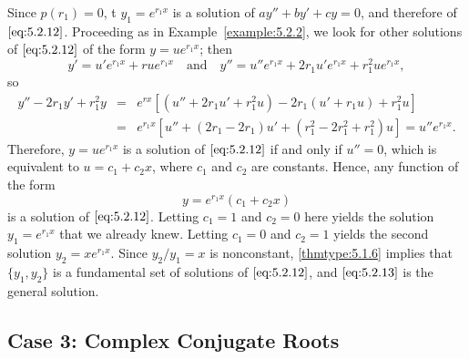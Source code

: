 \documentclass{ximera}
\begin{document}
Since $p(r_1)=0$, t $y_1=e^{r_1x}$ is a solution of
$ay''+by'+cy=0$, and therefore of $\eqref{eq:5.2.12}$. Proceeding as in
Example~\ref{example:5.2.2}, we look for other solutions of $\eqref{eq:5.2.12}$
of the form $y=ue^{r_1x}$; then
$$
y'=u'e^{r_1x}+rue^{r_1x}\quad\mbox{and}\quad
y''=u''e^{r_1x}+2r_1u'e^{r_1x}+r_1^2ue^{r_1x},
$$
so
\begin{eqnarray*}
y''-2r_1y'+r_1^2y&=&e^{rx}\left[(u''+2r_1u'+r_1^2u)-
2r_1(u'+r_1u)+r_1^2u\right]\\
&=&e^{r_1x}\left[u''+(2r_1-2r_1)u'+(r_1^2-2r_1^2+r_1^2)u\right]=u''e^{r_1x}.
\end{eqnarray*}
Therefore, $y=ue^{r_1x}$ is a solution of $\eqref{eq:5.2.12}$ if and only if
$u''=0$, which is equivalent to $u=c_1+c_2x$, where $c_1$ and $c_2$
are constants. Hence, any function of the form
\begin{equation} \label{eq:5.2.13}
y=e^{r_1x}(c_1+c_2x)
\end{equation}
is  a solution of $\eqref{eq:5.2.12}$.
Letting $c_1=1$ and $c_2=0$ here yields the solution
 $y_1=e^{r_1x}$ that we already knew. Letting $c_1=0$ and $c_2=1$
yields the second solution $y_2=xe^{r_1x}$. Since
$y_2/y_1=x$
is nonconstant, \ref{thmtype:5.1.6} implies that   $\{y_1,y_2\}$ is
a fundamental set of solutions of $\eqref{eq:5.2.12}$, and $\eqref{eq:5.2.13}$
is the general solution.
 
 
\subsection*{Case 3: Complex Conjugate Roots}
 
\end{document}
